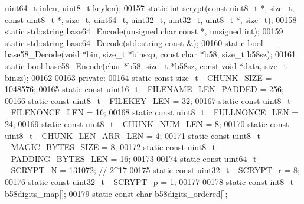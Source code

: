 \begin{DoxyCode}
      uint64\_t inlen, uint8\_t keylen);
00157     \textcolor{keyword}{static} \textcolor{keywordtype}{int}  scrypt(\textcolor{keyword}{const} uint8\_t *, \textcolor{keywordtype}{size\_t}, \textcolor{keyword}{const} uint8\_t *, \textcolor{keywordtype}{size\_t}, uint64\_t, uint32\_t, uint32\_t, 
      uint8\_t *, \textcolor{keywordtype}{size\_t});
00158     \textcolor{keyword}{static} std::string base64\_Encode(\textcolor{keywordtype}{unsigned} \textcolor{keywordtype}{char} \textcolor{keyword}{const} *, \textcolor{keywordtype}{unsigned} \textcolor{keywordtype}{int});
00159     \textcolor{keyword}{static} std::string base64\_Decode(std::string \textcolor{keyword}{const} &);
00160     \textcolor{keyword}{static} \textcolor{keywordtype}{bool} base58\_Decode(\textcolor{keywordtype}{void} *bin, \textcolor{keywordtype}{size\_t} *binszp, \textcolor{keyword}{const} \textcolor{keywordtype}{char} *b58, \textcolor{keywordtype}{size\_t} b58sz);
00161     \textcolor{keyword}{static} \textcolor{keywordtype}{bool} base58\_Encode(\textcolor{keywordtype}{char} *b58, \textcolor{keywordtype}{size\_t} *b58sz, \textcolor{keyword}{const} \textcolor{keywordtype}{void} *data, \textcolor{keywordtype}{size\_t} binsz);
00162 
00163   \textcolor{keyword}{private}:
00164     \textcolor{keyword}{static} \textcolor{keyword}{const} \textcolor{keywordtype}{size\_t}   \_CHUNK\_SIZE = 1048576;
00165     \textcolor{keyword}{static} \textcolor{keyword}{const} uint16\_t \_FILENAME\_LEN\_PADDED = 256;
00166     \textcolor{keyword}{static} \textcolor{keyword}{const} uint8\_t  \_FILEKEY\_LEN = 32;
00167     \textcolor{keyword}{static} \textcolor{keyword}{const} uint8\_t  \_FILENONCE\_LEN = 16;
00168     \textcolor{keyword}{static} \textcolor{keyword}{const} uint8\_t  \_FULLNONCE\_LEN = 24;
00169     \textcolor{keyword}{static} \textcolor{keyword}{const} uint8\_t  \_CHUNK\_NUM\_LEN = 8;
00170     \textcolor{keyword}{static} \textcolor{keyword}{const} uint8\_t  \_CHUNK\_LEN\_ARR\_LEN = 4;
00171     \textcolor{keyword}{static} \textcolor{keyword}{const} uint8\_t  \_MAGIC\_BYTES\_SIZE = 8;
00172     \textcolor{keyword}{static} \textcolor{keyword}{const} uint8\_t  \_PADDING\_BYTES\_LEN = 16;
00173 
00174     \textcolor{keyword}{static} \textcolor{keyword}{const} uint64\_t \_SCRYPT\_N = 131072; \textcolor{comment}{// 2^17}
00175     \textcolor{keyword}{static} \textcolor{keyword}{const} uint32\_t \_SCRYPT\_r = 8;
00176     \textcolor{keyword}{static} \textcolor{keyword}{const} uint32\_t \_SCRYPT\_p = 1;
00177 
00178     \textcolor{keyword}{static} \textcolor{keyword}{const} int8\_t b58digits\_map[];
00179     \textcolor{keyword}{static} \textcolor{keyword}{const} \textcolor{keywordtype}{char} b58digits\_ordered[];

\end{DoxyCode}
